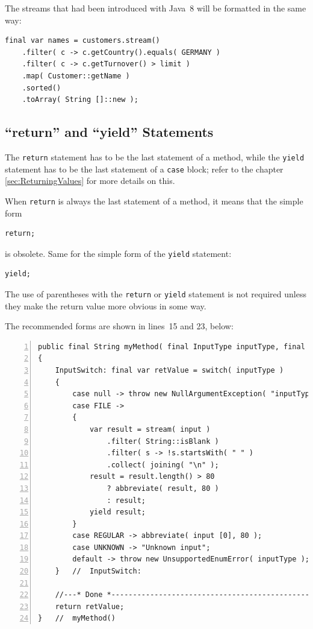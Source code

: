 \documentclass[11pt,a4paper, titlepage, parskip=half, headsepline, footsepline, cleardoublepage=current, headheight=1cm]{scrbook}
\begin{document}
The streams that had been introduced with Java~8 will be formatted in the same way:
\begin{lstlisting}
final var names = customers.stream()
    .filter( c -> c.getCountry().equals( GERMANY )
    .filter( c -> c.getTurnover() > limit )
    .map( Customer::getName )
    .sorted()
    .toArray( String []::new );
\end{lstlisting}

\subsection{“return” and “yield” Statements}
The \lstinline|return| statement has to be the last statement of a method, while the \lstinline|yield| statement has to be the last statement of a \lstinline|case| block; refer to the chapter \ref{sec:ReturningValues} for more details on this.

When \lstinline|return| is always the last statement of a method, it means that the simple form
\begin{lstlisting}
return;
\end{lstlisting}
is obsolete. Same for the simple form of the \lstinline|yield| statement:
\begin{lstlisting}
yield;
\end{lstlisting}

The use of parentheses with the \lstinline|return| or \lstinline|yield| statement is not required unless they make the return value more obvious in some way.

The recommended forms are shown in lines~15 and 23, below:
\begin{lstlisting}[numbers=left]
public final String myMethod( final InputType inputType, final String... input )
{
    InputSwitch: final var retValue = switch( inputType )
    {
        case null -> throw new NullArgumentException( "inputType" );
        case FILE -> 
        {
            var result = stream( input )
                .filter( String::isBlank )
                .filter( s -> !s.startsWith( " " )
                .collect( joining( "\n" );
            result = result.length() > 80
                ? abbreviate( result, 80 )
                : result;
            yield result;    
        }
        case REGULAR -> abbreviate( input [0], 80 );
        case UNKNOWN -> "Unknown input";
        default -> throw new UnsupportedEnumError( inputType );
    }   //  InputSwitch:
    
    //---* Done *----------------------------------------------------
    return retValue;
}   //  myMethod()
\end{lstlisting}
\end{document}
